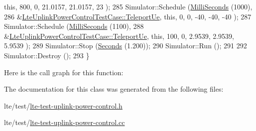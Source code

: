 \begin{DoxyCode}
       \textcolor{keyword}{this}, 800, 0, 21.0157, 21.0157, 23 );
285   Simulator::Schedule (\hyperlink{group__timecivil_gaf26127cf4571146b83a92ee18679c7a9}{MilliSeconds} (1000),
286                        &\hyperlink{classLteUplinkPowerControlTestCase_a97a59d65135bb418dd2aaabd673c5da0}{LteUplinkPowerControlTestCase::TeleportUe},
       \textcolor{keyword}{this}, 0, 0, -40, -40, -40 );
287   Simulator::Schedule (\hyperlink{group__timecivil_gaf26127cf4571146b83a92ee18679c7a9}{MilliSeconds} (1100),
288                        &\hyperlink{classLteUplinkPowerControlTestCase_a97a59d65135bb418dd2aaabd673c5da0}{LteUplinkPowerControlTestCase::TeleportUe},
       \textcolor{keyword}{this}, 100, 0, 2.9539, 2.9539, 5.9539 );
289   Simulator::Stop (\hyperlink{group__timecivil_ga33c34b816f8ff6628e33d5c8e9713b9e}{Seconds} (1.200));
290   Simulator::Run ();
291 
292   Simulator::Destroy ();
293 \}
\end{DoxyCode}


Here is the call graph for this function\+:




The documentation for this class was generated from the following files\+:\begin{DoxyCompactItemize}
\item 
lte/test/\hyperlink{lte-test-uplink-power-control_8h}{lte-\/test-\/uplink-\/power-\/control.\+h}\item 
lte/test/\hyperlink{lte-test-uplink-power-control_8cc}{lte-\/test-\/uplink-\/power-\/control.\+cc}\end{DoxyCompactItemize}
